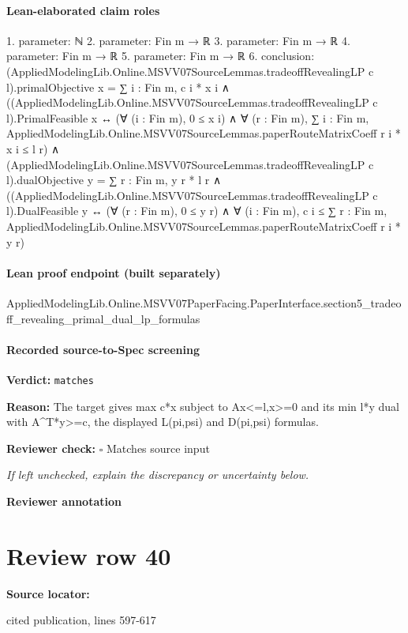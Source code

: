 \documentclass[10pt]{article}
\newcommand{\reviewerbox}{%
  \par\noindent\fbox{\parbox{0.96\linewidth}{\rule{0pt}{0.38in}}}\par
}
\newcommand{\reviewmatch}[1]{%
  \par\noindent\textbf{Reviewer check:} $\square$\; #1\par
  \noindent\emph{If left unchecked, explain the discrepancy or uncertainty below.}\par
}
\begin{document}
\paragraph{Lean-elaborated claim roles}\begin{ReviewVerbatim}
1. parameter: ℕ
2. parameter: Fin m → ℝ
3. parameter: Fin m → ℝ
4. parameter: Fin m → ℝ
5. parameter: Fin m → ℝ
6. conclusion: (AppliedModelingLib.Online.MSVV07SourceLemmas.tradeoffRevealingLP c l).primalObjective x = ∑ i : Fin m, c i * x i ∧
  ((AppliedModelingLib.Online.MSVV07SourceLemmas.tradeoffRevealingLP c l).PrimalFeasible x ↔
      (∀ (i : Fin m), 0 ≤ x i) ∧
        ∀ (r : Fin m),
          ∑ i : Fin m, AppliedModelingLib.Online.MSVV07SourceLemmas.paperRouteMatrixCoeff r i * x i ≤ l r) ∧
    (AppliedModelingLib.Online.MSVV07SourceLemmas.tradeoffRevealingLP c l).dualObjective y = ∑ r : Fin m, y r * l r ∧
      ((AppliedModelingLib.Online.MSVV07SourceLemmas.tradeoffRevealingLP c l).DualFeasible y ↔
        (∀ (r : Fin m), 0 ≤ y r) ∧
          ∀ (i : Fin m),
            c i ≤ ∑ r : Fin m, AppliedModelingLib.Online.MSVV07SourceLemmas.paperRouteMatrixCoeff r i * y r)
\end{ReviewVerbatim}

\paragraph{Lean proof endpoint (built separately)}\begin{ReviewVerbatim}
AppliedModelingLib.Online.MSVV07PaperFacing.PaperInterface.section5_tradeoff_revealing_primal_dual_lp_formulas
\end{ReviewVerbatim}

\paragraph{Recorded source-to-Spec screening}
\textbf{Verdict:} \texttt{matches}
\\
{\raggedright
\textbf{Reason:} The target gives max c*x subject to Ax<=l,x>=0 and its min l*y dual with A\textasciicircum{}T*y>=c, the displayed L(pi,psi) and D(pi,psi) formulas.\allowbreak{}
\par}
\reviewmatch{Matches source input}
\noindent\textbf{Reviewer annotation}\par
\reviewerbox
\clearpage
\hypertarget{source-claim-62bca80af2d9477b}{}
\section*{Review row 40}
\textbf{Source locator:} {\footnotesize\raggedright cited publication, lines 597-\allowbreak{}617\par}
\end{document}
